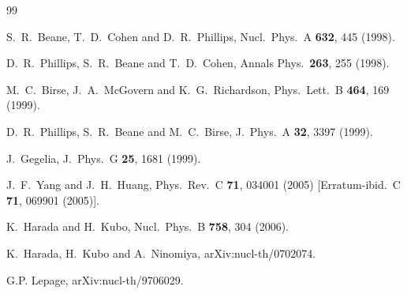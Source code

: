 \documentclass[aps,rmp,nofootinbib,twocolumn,floatfix]{revtex4}
\begin{document}
\begin{thebibliography}{99}

  S.~R.~Beane, T.~D.~Cohen and D.~R.~Phillips,
  Nucl.\ Phys.\  A {\bf 632}, 445 (1998).

  D.~R.~Phillips, S.~R.~Beane and T.~D.~Cohen,
  Annals Phys.\  {\bf 263}, 255 (1998).

  M.~C.~Birse, J.~A.~McGovern and K.~G.~Richardson,
  Phys.\ Lett.\  B {\bf 464}, 169 (1999).

  D.~R.~Phillips, S.~R.~Beane and M.~C.~Birse,
  J.\ Phys.\ A  {\bf 32}, 3397 (1999).


  J.~Gegelia,
  J.\ Phys.\ G {\bf 25}, 1681 (1999).

  J.~F.~Yang and J.~H.~Huang,
  Phys.\ Rev.\  C {\bf 71}, 034001 (2005)
  [Erratum-ibid.\  C {\bf 71}, 069901 (2005)].

  K.~Harada and H.~Kubo,
  Nucl.\ Phys.\  B {\bf 758}, 304 (2006).

  K.~Harada, H.~Kubo and A.~Ninomiya,
  arXiv:nucl-th/0702074.

G.P. Lepage,
arXiv:nucl-th/9706029.


\end{thebibliography}
\end{document}
